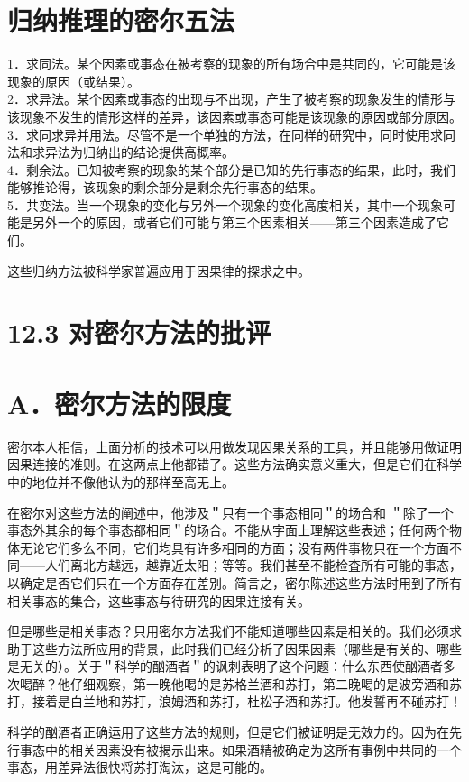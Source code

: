 \section*{归纳推理的密尔五法}
1．求同法。某个因素或事态在被考察的现象的所有场合中是共同的，它可能是该现象的原因（或结果）。\\
2．求异法。某个因素或事态的出现与不出现，产生了被考察的现象发生的情形与该现象不发生的情形这样的差异，该因素或事态可能是该现象的原因或部分原因。\\
3．求同求异并用法。尽管不是一个单独的方法，在同样的研究中，同时使用求同法和求异法为归纳出的结论提供高概率。\\
4．剩余法。已知被考察的现象的某个部分是已知的先行事态的结果，此时，我们能够推论得，该现象的剩余部分是剩余先行事态的结果。\\
5．共变法。当一个现象的变化与另外一个现象的变化高度相关，其中一个现象可能是另外一个的原因，或者它们可能与第三个因素相关——第三个因素造成了它们。

这些归纳方法被科学家普遍应用于因果律的探求之中。

\section*{12.3 对密尔方法的批评}
\section*{A．密尔方法的限度}
密尔本人相信，上面分析的技术可以用做发现因果关系的工具，并且能够用做证明因果连接的准则。在这两点上他都错了。这些方法确实意义重大，但是它们在科学中的地位并不像他认为的那样至高无上。

在密尔对这些方法的阐述中，他涉及＂只有一个事态相同＂的场合和 ＂除了一个事态外其余的每个事态都相同＂的场合。不能从字面上理解这些表述；任何两个物体无论它们多么不同，它们均具有许多相同的方面；没有两件事物只在一个方面不同——人们离北方越远，越靠近太阳；等等。我们甚至不能检査所有可能的事态，以确定是否它们只在一个方面存在差别。简言之，密尔陈述这些方法时用到了所有相关事态的集合，这些事态与待研究的因果连接有关。

但是哪些是相关事态？只用密尔方法我们不能知道哪些因素是相关的。我们必须求助于这些方法所应用的背景，此时我们已经分析了因果因素（哪些是有关的、哪些是无关的）。关于＂科学的酗酒者＂的讽刺表明了这个问题：什么东西使酗酒者多次喝醉？他仔细观察，第一晚他喝的是苏格兰酒和苏打，第二晚喝的是波旁酒和苏打，接着是白兰地和苏打，浪姆酒和苏打，杜松子酒和苏打。他发誓再不碰苏打！

科学的酗酒者正确运用了这些方法的规则，但是它们被证明是无效力的。因为在先行事态中的相关因素没有被揭示出来。如果酒精被确定为这所有事例中共同的一个事态，用差异法很快将苏打淘汰，这是可能的。

